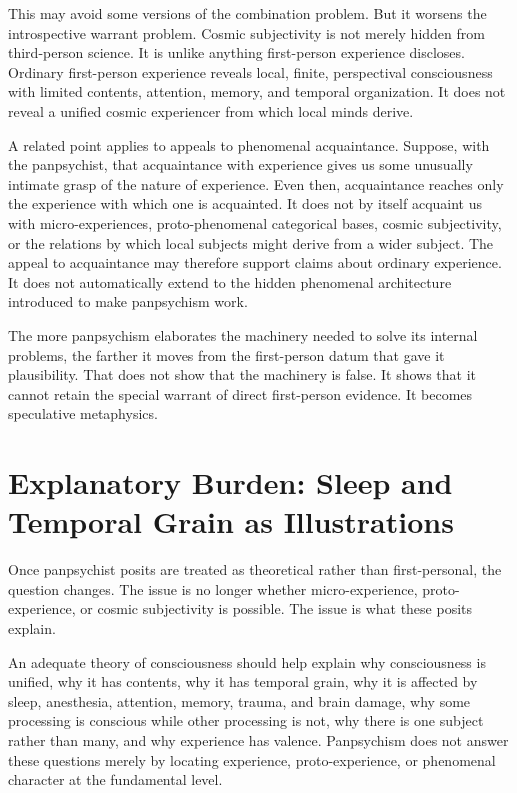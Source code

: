 \documentclass[12pt]{article}
\begin{document}
This may avoid some versions of the combination problem. But it worsens the introspective warrant problem. Cosmic subjectivity is not merely hidden from third-person science. It is unlike anything first-person experience discloses. Ordinary first-person experience reveals local, finite, perspectival consciousness with limited contents, attention, memory, and temporal organization. It does not reveal a unified cosmic experiencer from which local minds derive.

A related point applies to appeals to phenomenal acquaintance. Suppose, with the panpsychist, that acquaintance with experience gives us some unusually intimate grasp of the nature of experience. Even then, acquaintance reaches only the experience with which one is acquainted. It does not by itself acquaint us with micro-experiences, proto-phenomenal categorical bases, cosmic subjectivity, or the relations by which local subjects might derive from a wider subject. The appeal to acquaintance may therefore support claims about ordinary experience. It does not automatically extend to the hidden phenomenal architecture introduced to make panpsychism work.

The more panpsychism elaborates the machinery needed to solve its internal problems, the farther it moves from the first-person datum that gave it plausibility. That does not show that the machinery is false. It shows that it cannot retain the special warrant of direct first-person evidence. It becomes speculative metaphysics.

\section{Explanatory Burden: Sleep and Temporal Grain as Illustrations}

Once panpsychist posits are treated as theoretical rather than first-personal, the question changes. The issue is no longer whether micro-experience, proto-experience, or cosmic subjectivity is possible. The issue is what these posits explain.

An adequate theory of consciousness should help explain why consciousness is unified, why it has contents, why it has temporal grain, why it is affected by sleep, anesthesia, attention, memory, trauma, and brain damage, why some processing is conscious while other processing is not, why there is one subject rather than many, and why experience has valence. Panpsychism does not answer these questions merely by locating experience, proto-experience, or phenomenal character at the fundamental level.
\end{document}
